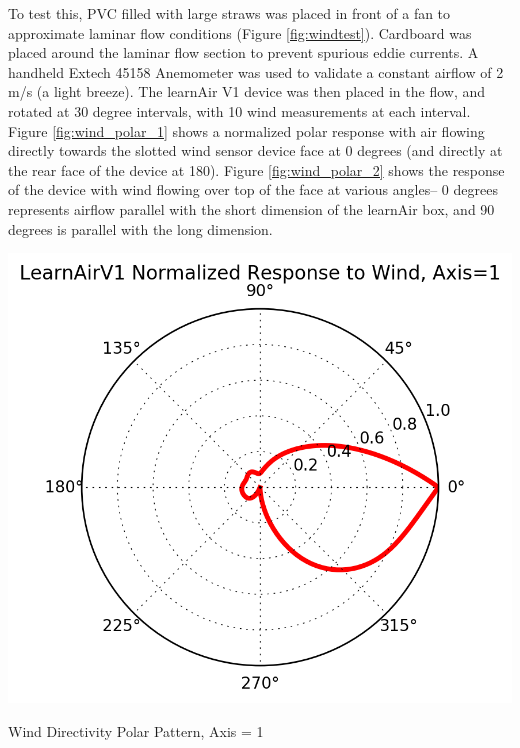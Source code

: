 To test this, PVC filled with large straws was placed in front of a fan to approximate laminar flow conditions (Figure \ref{fig:windtest}).  Cardboard was placed around the laminar flow section to prevent spurious eddie currents.  A handheld Extech 45158 Anemometer was used to validate a constant airflow of 2 m/s (a light breeze).  The learnAir V1 device was then placed in the flow, and rotated at 30 degree intervals, with 10 wind measurements at each interval.  Figure \ref{fig:wind_polar_1} shows a normalized polar response with air flowing directly towards the slotted wind sensor device face at 0 degrees (and directly at the rear face of the device at 180).  Figure \ref{fig:wind_polar_2} shows the response of the device with wind flowing over top of the face at various angles-- 0 degrees represents airflow parallel with the short dimension of the learnAir box, and 90 degrees is parallel with the long dimension.


\begin{marginfigure}[3cm]
 	\includegraphics[width=\textwidth]{figs/wind_polar_1}               
 	 \caption{Wind Directivity Polar Pattern, Axis = 1}
  	\label{fig:wind_polar_1}
\end{marginfigure}

